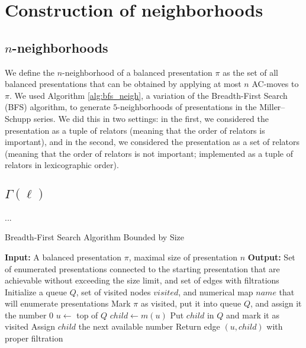 
\section{Construction of neighborhoods}\label{s:neighborhoods}

\subsection{$n$-neighborhoods}

We define the $n$-neighborhood of a balanced presentation $\pi$ as the set of all balanced presentations that can be obtained by applying at most $n$ AC-moves to $\pi$.
We used Algorithm \ref{alg:bfs_neigh}, a variation of the Breadth-First Search (BFS) algorithm, to generate $5$-neighborhoods of presentations in the Miller–Schupp series.
We did this in two settings: in the first, we considered the presentation as a tuple of relators (meaning that the order of relators is important), and in the second, we considered the presentation as a set of relators (meaning that the order of relators is not important; implemented as a tuple of relators in lexicographic order).

\subsection{$\Gamma(\ell)$} ...

\begin{algorithm}
	\caption{Breadth-First Search Algorithm Bounded by Size}\label{alg:bfs_1}
	\begin{algorithmic}[1]
		\State \textbf{Input:} A balanced presentation $\pi$, maximal size of presentation $n$
		\State \textbf{Output:} Set of enumerated presentations connected to the starting presentation that are achievable without exceeding the size limit, and set of edges with filtrations
		\State Initialize a queue $Q$, set of visited nodes $visited$, and numerical map $name$ that will enumerate presentations
		\State Mark $\pi$ as visited, put it into queue $Q$, and assign it the number $0$
		\State $u \gets $ top of $Q$ 
		\State $child \gets m(u)$
		\State Put $child$ in $Q$ and mark it as visited
		\State Assign $child$ the next available number
		\EndIf
		\State Return edge $(u, child)$ with proper filtration
		\EndIf
		\EndFor
		\EndWhile
	\end{algorithmic}
\end{algorithm}

